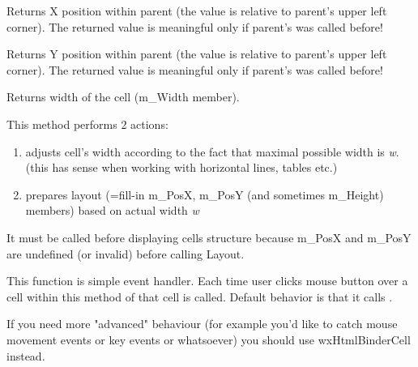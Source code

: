 
Returns X position within parent (the value is relative to parent's
upper left corner). The returned value is meaningful only if
parent's  was called before!

\label{wxhtmlcellgetposy}


Returns Y position within parent (the value is relative to parent's
upper left corner). The returned value is meaningful only if
parent's  was called before!

\label{wxhtmlcellgetwidth}


Returns width of the cell (m\_Width member).

\label{wxhtmlcelllayout}


This method performs 2 actions:

\begin{enumerate}\itemsep=0pt
\item adjusts cell's width according to the fact that maximal possible width is {\it w}.
(this has sense when working with horizontal lines, tables etc.)
\item prepares layout (=fill-in m\_PosX, m\_PosY (and sometimes m\_Height) members)
based on actual width {\it w}
\end{enumerate}

It must be called before displaying cells structure because
m\_PosX and m\_PosY are undefined (or invalid)
before calling Layout.

\label{wxhtmlcellonmouseclick}


This function is simple event handler. Each time user clicks mouse button over a cell
within  this method of that cell is called. Default behavior is
that it calls .


If you need more "advanced" behaviour (for example you'd like to catch mouse movement events or
key events or whatsoever) you should use wxHtmlBinderCell instead.

